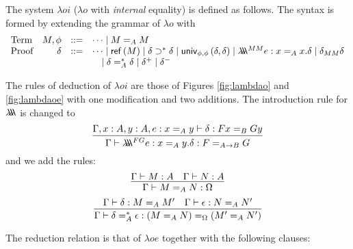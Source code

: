 The system $\lambda o i$ ($\lambda o$ with \emph{internal} equality) is defined as follows.  The
syntax is formed by extending the grammar of $\lambda o$ with
\[
\begin{array}{lrcl}
\text{Term} & M, \phi & ::= & \cdots \mid M =_A M \\
\text{Proof} & \delta & ::= & \cdots \mid \mathsf{ref} \left( {M} \right) \mid \delta \supset^* \delta \mid \mathsf{univ}_{{\phi} , {\phi}} \left( {\delta} , {\delta} \right) \mid \lambda \!\! \lambda \!\! \lambda^{MM} e : x =_A x . \delta \mid \delta_{MM} \delta\\
& & & \quad \mid \delta =^*_A \delta \mid \delta^+ \mid \delta^-
\end{array}
\]

The rules of deduction of $\lambda o i$ are those of Figures \ref{fig:lambdao} and \ref{fig:lambdaoe} with one modification and two additions.  The introduction rule for $\lambda \!\! \lambda \!\! \lambda$ is changed to %
\[ \infer{\Gamma \vdash \triplelambda^{FG} e : x =_A y . \delta : F =_{A \rightarrow B} G}
{\Gamma, x : A, y : A, e : x =_A y \vdash \delta : F x =_B G y} \]
and we add the rules:
\[ \infer{\Gamma \vdash M =_A N : \Omega}{\Gamma \vdash M : A \quad \Gamma \vdash N : A} \]
\[ \infer{\Gamma \vdash \delta =^*_A \epsilon : (M =_A N) =_\Omega (M' =_A N')}
{\Gamma \vdash \delta : M =_A M' \quad \Gamma \vdash \epsilon : N =_A N'} \]

The reduction relation is that of $\lambda o e$ together with the following clauses:

